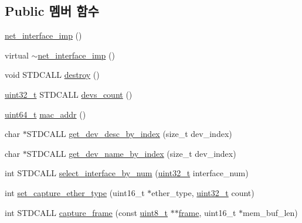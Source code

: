 \subsection*{Public 멤버 함수}
\begin{DoxyCompactItemize}
\item 
\hyperlink{classavdecc__lib_1_1net__interface__imp_a3bf5c0e9fa4e81aa32795b5ddae22694}{net\+\_\+interface\+\_\+imp} ()
\item 
virtual \hyperlink{classavdecc__lib_1_1net__interface__imp_a438d7eb76b1244d07e31d019ecd4fc59}{$\sim$net\+\_\+interface\+\_\+imp} ()
\item 
void S\+T\+D\+C\+A\+LL \hyperlink{classavdecc__lib_1_1net__interface__imp_a644cfaa829dbec5c28d5d29a6789e8c4}{destroy} ()
\item 
\hyperlink{parse_8c_a6eb1e68cc391dd753bc8ce896dbb8315}{uint32\+\_\+t} S\+T\+D\+C\+A\+LL \hyperlink{classavdecc__lib_1_1net__interface__imp_a779d955a4fe34cff088021f802e150c2}{devs\+\_\+count} ()
\item 
\hyperlink{parse_8c_aec6fcb673ff035718c238c8c9d544c47}{uint64\+\_\+t} \hyperlink{classavdecc__lib_1_1net__interface__imp_a742e975c065f9067f42182847df080da}{mac\+\_\+addr} ()
\item 
char $\ast$S\+T\+D\+C\+A\+LL \hyperlink{classavdecc__lib_1_1net__interface__imp_adab8e7d9fcecacda7a67ae119341ab3d}{get\+\_\+dev\+\_\+desc\+\_\+by\+\_\+index} (size\+\_\+t dev\+\_\+index)
\item 
char $\ast$S\+T\+D\+C\+A\+LL \hyperlink{classavdecc__lib_1_1net__interface__imp_aa3b053bd42cfcc7399468a91d465de87}{get\+\_\+dev\+\_\+name\+\_\+by\+\_\+index} (size\+\_\+t dev\+\_\+index)
\item 
int S\+T\+D\+C\+A\+LL \hyperlink{classavdecc__lib_1_1net__interface__imp_ab8d35d1767e1df005964f2ef912f085e}{select\+\_\+interface\+\_\+by\+\_\+num} (\hyperlink{parse_8c_a6eb1e68cc391dd753bc8ce896dbb8315}{uint32\+\_\+t} interface\+\_\+num)
\item 
int \hyperlink{classavdecc__lib_1_1net__interface__imp_a11723236c6bc4f4b0c152ceb0c44b786}{set\+\_\+capture\+\_\+ether\+\_\+type} (uint16\+\_\+t $\ast$ether\+\_\+type, \hyperlink{parse_8c_a6eb1e68cc391dd753bc8ce896dbb8315}{uint32\+\_\+t} count)
\item 
int S\+T\+D\+C\+A\+LL \hyperlink{classavdecc__lib_1_1net__interface__imp_a52700aecb2987cd1b864f50991089a9b}{capture\+\_\+frame} (const \hyperlink{stdint_8h_aba7bc1797add20fe3efdf37ced1182c5}{uint8\+\_\+t} $\ast$$\ast$\hyperlink{gst__avb__playbin_8c_ac8e710e0b5e994c0545d75d69868c6f0}{frame}, uint16\+\_\+t $\ast$mem\+\_\+buf\+\_\+len)
$$
\end{DoxyCompactItemize}
